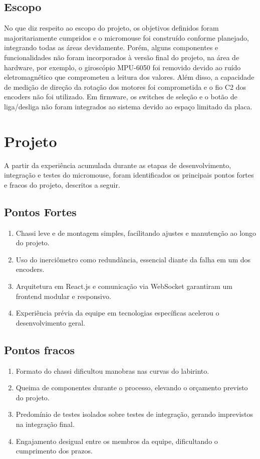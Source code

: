 \subsection{Escopo}

No que diz respeito ao escopo do projeto, os objetivos definidos foram majoritariamente cumpridos e o micromouse foi construído conforme planejado, 
integrando todas as áreas devidamente. Porém, alguns componentes e funcionalidades não foram incorporados à versão final do projeto, na área de hardware, por exemplo,
o giroscópio MPU-6050 foi removido devido ao ruído eletromagnético que comprometeu a leitura dos valores. Além disso, a capacidade de medição de direção 
da rotação dos motores foi comprometida e o fio C2 dos encoders não foi utilizado. Em firmware, os switches de seleção e o botão de liga/desliga não foram integrados ao sistema devido
ao espaço limitado da placa.


\section{Projeto}

A partir da experiência acumulada durante as etapas de desenvolvimento, integração e testes do micromouse, foram identificados os principais pontos fortes e fracos do projeto, descritos a seguir.

\subsection{Pontos Fortes}

\begin{enumerate}
    \item Chassi leve e de montagem simples, facilitando ajustes e manutenção ao longo do projeto.
    \item Uso do inerciômetro como redundância, essencial diante da falha em um dos encoders.
    \item Arquitetura em React.js e comunicação via WebSocket garantiram um frontend modular e responsivo.
    \item Experiência prévia da equipe em tecnologias específicas acelerou o desenvolvimento geral.
\end{enumerate}

\subsection{Pontos fracos}

\begin{enumerate}
    \item Formato do chassi dificultou manobras nas curvas do labirinto.
    \item Queima de componentes durante o processo, elevando o orçamento previsto do projeto.
    \item Predomínio de testes isolados sobre testes de integração, gerando imprevistos na integração final.
    \item Engajamento desigual entre os membros da equipe, dificultando o cumprimento dos prazos.
\end{enumerate}


